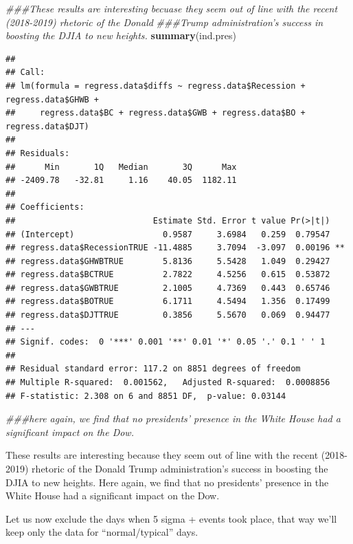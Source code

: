 \documentclass[]{article}
\newenvironment{Shaded}{\begin{snugshade}}{\end{snugshade}}
\newcommand{\CommentTok}[1]{\textcolor[rgb]{0.56,0.35,0.01}{\textit{#1}}}
\newcommand{\KeywordTok}[1]{\textcolor[rgb]{0.13,0.29,0.53}{\textbf{#1}}}
\newcommand{\NormalTok}[1]{#1}
\begin{document}
\begin{Shaded}
\begin{Highlighting}[]
\CommentTok{###These results are interesting becuase they seem out of line with the recent (2018-2019) rhetoric of the Donald }
\CommentTok{###Trump administration's success in boosting the DJIA to new heights.}
\KeywordTok{summary}\NormalTok{(ind.pres)}
\end{Highlighting}
\end{Shaded}

\begin{verbatim}
## 
## Call:
## lm(formula = regress.data$diffs ~ regress.data$Recession + regress.data$GHWB + 
##     regress.data$BC + regress.data$GWB + regress.data$BO + regress.data$DJT)
## 
## Residuals:
##      Min       1Q   Median       3Q      Max 
## -2409.78   -32.81     1.16    40.05  1182.11 
## 
## Coefficients:
##                            Estimate Std. Error t value Pr(>|t|)   
## (Intercept)                  0.9587     3.6984   0.259  0.79547   
## regress.data$RecessionTRUE -11.4885     3.7094  -3.097  0.00196 **
## regress.data$GHWBTRUE        5.8136     5.5428   1.049  0.29427   
## regress.data$BCTRUE          2.7822     4.5256   0.615  0.53872   
## regress.data$GWBTRUE         2.1005     4.7369   0.443  0.65746   
## regress.data$BOTRUE          6.1711     4.5494   1.356  0.17499   
## regress.data$DJTTRUE         0.3856     5.5670   0.069  0.94477   
## ---
## Signif. codes:  0 '***' 0.001 '**' 0.01 '*' 0.05 '.' 0.1 ' ' 1
## 
## Residual standard error: 117.2 on 8851 degrees of freedom
## Multiple R-squared:  0.001562,   Adjusted R-squared:  0.0008856 
## F-statistic: 2.308 on 6 and 8851 DF,  p-value: 0.03144
\end{verbatim}

\begin{Shaded}
\begin{Highlighting}[]
\CommentTok{###here again, we find that no presidents' presence in the White House had a significant impact on the Dow.}
\end{Highlighting}
\end{Shaded}

These results are interesting because they seem out of line with the
recent (2018-2019) rhetoric of the Donald Trump administration's success
in boosting the DJIA to new heights. Here again, we find that no
presidents' presence in the White House had a significant impact on the
Dow.

Let us now exclude the days when 5 sigma + events took place, that way
we'll keep only the data for ``normal/typical'' days.
\end{document}
